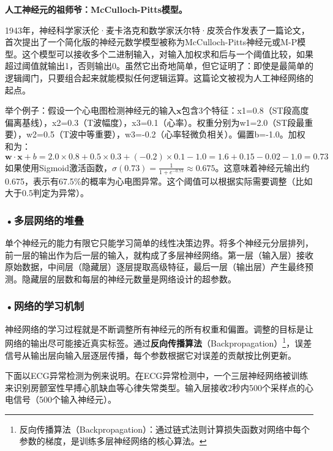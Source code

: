 \begin{knowledgebox}
\small
\textbf{人工神经元的祖师爷：McCulloch-Pitts模型。}

1943年，神经科学家沃伦·麦卡洛克和数学家沃尔特·皮茨合作发表了一篇论文，首次提出了一个简化版的神经元数学模型被称为McCulloch-Pitts神经元或M-P模型。这个模型可以接收多个二进制输入，对输入加权求和后与一个阈值比较，如果超过阈值就输出1，否则输出0。虽然它出奇地简单，但它证明了：即使是最简单的逻辑阈门，只要组合起来就能模拟任何逻辑运算。这篇论文被视为人工神经网络的起点。
\end{knowledgebox}

举个例子：假设一个心电图检测神经元的输入$\mathbf{x}$包含3个特征：x1=0.8（ST段高度偏离基线），x2=0.3（T波幅度），x3=0.1（心率）。权重分别为w1=2.0（ST段最重要），w2=0.5（T波中等重要），w3=-0.2（心率轻微负相关）。偏置b=-1.0。加权和为：
\[
\mathbf{w} \cdot \mathbf{x} + b = 2.0 \times 0.8 + 0.5 \times 0.3 + (-0.2) \times 0.1 - 1.0 = 1.6 + 0.15 - 0.02 - 1.0 = 0.73
\]
如果使用Sigmoid激活函数，$\sigma(0.73) = \frac{1}{1+e^{-0.73}} \approx 0.675$。这意味着神经元输出约0.675，表示有67.5\%的概率为心电图异常。这个阈值可以根据实际需要调整（比如大于0.5判定为异常）。

\subsubsection*{\textbf{•多层网络的堆叠}}

单个神经元的能力有限它只能学习简单的线性决策边界。将多个神经元分层排列，前一层的输出作为后一层的输入，就构成了多层神经网络。第一层（输入层）接收原始数据，中间层（隐藏层）逐层提取高级特征，最后一层（输出层）产生最终预测。隐藏层的层数和每层的神经元数量是网络设计的超参数。

\subsubsection*{\textbf{•网络的学习机制}}

神经网络的学习过程就是不断调整所有神经元的所有权重和偏置。调整的目标是让网络的输出尽可能接近真实标签。通过\textbf{反向传播算法}（Backpropagation）\footnote{反向传播算法（Backpropagation）：通过链式法则计算损失函数对网络中每个参数的梯度，是训练多层神经网络的核心算法。}，误差信号从输出层向输入层逐层传播，每个参数根据它对误差的贡献按比例更新。

下面以ECG异常检测为例来说明。在ECG异常检测中，一个三层神经网络被训练来识别房颤室性早搏心肌缺血等心律失常类型。输入层接收2秒内500个采样点的心电信号（500个输入神经元）。


